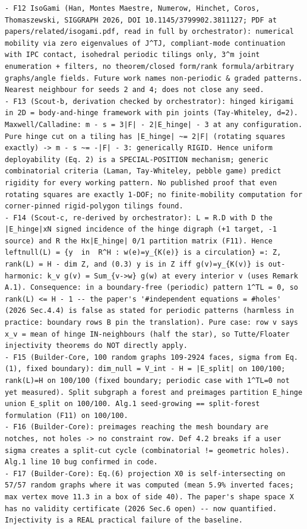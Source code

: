 \documentclass[10pt,a4paper]{article}
\begin{document}
\begin{lstlisting}
- F12 IsoGami (Han, Montes Maestre, Numerow, Hinchet, Coros, Thomaszewski, SIGGRAPH 2026, DOI 10.1145/3799902.3811127; PDF at papers/related/isogami.pdf, read in full by orchestrator): numerical mobility via zero eigenvalues of J^TJ, compliant-mode continuation with IPC contact, isohedral periodic tilings only, 3^m joint enumeration + filters, no theorem/closed form/rank formula/arbitrary graphs/angle fields. Future work names non-periodic & graded patterns. Nearest neighbour for seeds 2 and 4; does not close any seed.
- F13 (Scout-b, derivation checked by orchestrator): hinged kirigami in 2D = body-and-hinge framework with pin joints (Tay-Whiteley, d=2). Maxwell/Calladine: m - s = 3|F| - 2|E_hinge| - 3 at any configuration. Pure hinge cut on a tiling has |E_hinge| ~= 2|F| (rotating squares exactly) -> m - s ~= -|F| - 3: generically RIGID. Hence uniform deployability (Eq. 2) is a SPECIAL-POSITION mechanism; generic combinatorial criteria (Laman, Tay-Whiteley, pebble game) predict rigidity for every working pattern. No published proof that even rotating squares are exactly 1-DOF; no finite-mobility computation for corner-pinned rigid-polygon tilings found.
- F14 (Scout-c, re-derived by orchestrator): L = R.D with D the |E_hinge|xN signed incidence of the hinge digraph (+1 target, -1 source) and R the Hx|E_hinge| 0/1 partition matrix (F11). Hence leftnull(L) = {y  in  R^H : w(e)=y_{K(e)} is a circulation} =: Z, rank(L) = H - dim Z, and (0.3) y is in Z iff g(v)=y_{K(v)} is out-harmonic: k_v g(v) = Sum_{v->w} g(w) at every interior v (uses Remark A.1). Consequence: in a boundary-free (periodic) pattern 1^TL = 0, so rank(L) <= H - 1 -- the paper's '#independent equations = #holes' (2026 Sec.4.4) is false as stated for periodic patterns (harmless in practice: boundary rows B pin the translation). Pure case: row v says x_v = mean of hinge IN-neighbours (half the star), so Tutte/Floater injectivity theorems do NOT directly apply.
- F15 (Builder-Core, 100 random graphs 109-2924 faces, sigma from Eq.(1), fixed boundary): dim_null = V_int - H = |E_split| on 100/100; rank(L)=H on 100/100 (fixed boundary; periodic case with 1^TL=0 not yet measured). Split subgraph a forest and preimages partition E_hinge union E_split on 100/100. Alg.1 seed-growing == split-forest formulation (F11) on 100/100.
- F16 (Builder-Core): preimages reaching the mesh boundary are notches, not holes -> no constraint row. Def 4.2 breaks if a user sigma creates a split-cut cycle (combinatorial != geometric holes). Alg.1 line 10 bug confirmed in code.
- F17 (Builder-Core): Eq.(6) projection X0 is self-intersecting on 57/57 random graphs where it was computed (mean 5.9% inverted faces; max vertex move 11.3 in a box of side 40). The paper's shape space X has no validity certificate (2026 Sec.6 open) -- now quantified. Injectivity is a REAL practical failure of the baseline.

\end{lstlisting}
\end{document}
